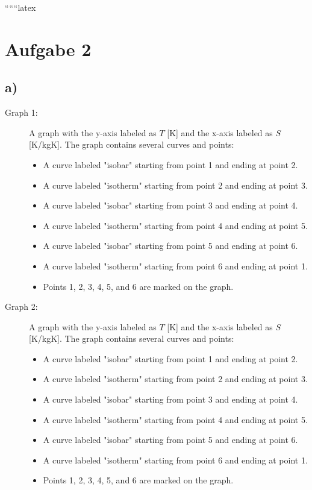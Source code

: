 
``````latex


\section*{Aufgabe 2}

\subsection*{a)}

\begin{description}
    \item[Graph 1:] A graph with the y-axis labeled as $T$ [K] and the x-axis labeled as $S$ [K/kgK]. The graph contains several curves and points:
    \begin{itemize}
        \item A curve labeled "isobar" starting from point 1 and ending at point 2.
        \item A curve labeled "isotherm" starting from point 2 and ending at point 3.
        \item A curve labeled "isobar" starting from point 3 and ending at point 4.
        \item A curve labeled "isotherm" starting from point 4 and ending at point 5.
        \item A curve labeled "isobar" starting from point 5 and ending at point 6.
        \item A curve labeled "isotherm" starting from point 6 and ending at point 1.
        \item Points 1, 2, 3, 4, 5, and 6 are marked on the graph.
    \end{itemize}
    
    \item[Graph 2:] A graph with the y-axis labeled as $T$ [K] and the x-axis labeled as $S$ [K/kgK]. The graph contains several curves and points:
    \begin{itemize}
        \item A curve labeled "isobar" starting from point 1 and ending at point 2.
        \item A curve labeled "isotherm" starting from point 2 and ending at point 3.
        \item A curve labeled "isobar" starting from point 3 and ending at point 4.
        \item A curve labeled "isotherm" starting from point 4 and ending at point 5.
        \item A curve labeled "isobar" starting from point 5 and ending at point 6.
        \item A curve labeled "isotherm" starting from point 6 and ending at point 1.
        \item Points 1, 2, 3, 4, 5, and 6 are marked on the graph.
    \end{itemize}
\end{description}

